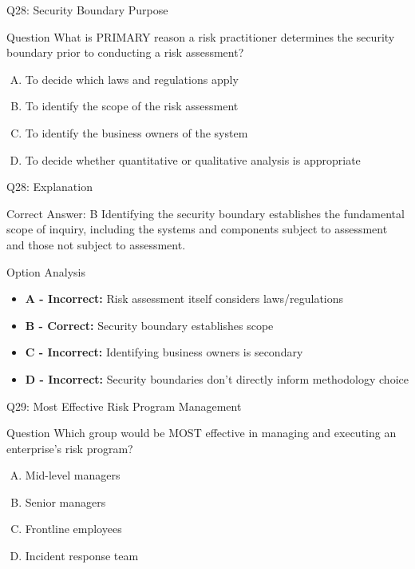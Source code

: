 \documentclass{beamer}
\begin{document}
	\begin{frame}{Q28: Security Boundary Purpose}
		\begin{block}{Question}
			What is PRIMARY reason a risk practitioner determines the security boundary prior to conducting a risk assessment?
		\end{block}
		\begin{enumerate}[(A)]
			\item To decide which laws and regulations apply
			\item To identify the scope of the risk assessment
			\item To identify the business owners of the system
			\item To decide whether quantitative or qualitative analysis is appropriate
		\end{enumerate}
	\end{frame}
	
	\begin{frame}{Q28: Explanation}
		\begin{block}{Correct Answer: B}
			Identifying the security boundary establishes the fundamental scope of inquiry, including the systems and components subject to assessment and those not subject to assessment.
		\end{block}
		\begin{block}{Option Analysis}
			\begin{itemize}
				\item \textbf{A - Incorrect:} Risk assessment itself considers laws/regulations
				\item \textbf{B - Correct:} Security boundary establishes scope
				\item \textbf{C - Incorrect:} Identifying business owners is secondary
				\item \textbf{D - Incorrect:} Security boundaries don't directly inform methodology choice
			\end{itemize}
		\end{block}
	\end{frame}
	
	\begin{frame}{Q29: Most Effective Risk Program Management}
		\begin{block}{Question}
			Which group would be MOST effective in managing and executing an enterprise's risk program?
		\end{block}
		\begin{enumerate}[(A)]
			\item Mid-level managers
			\item Senior managers
			\item Frontline employees
			\item Incident response team
		\end{enumerate}
	\end{frame}
	
\end{document}
